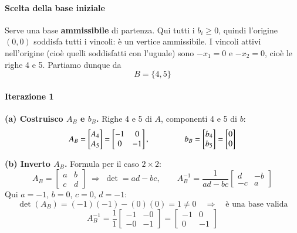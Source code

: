 \documentclass[12pt]{extarticle} %
\begin{document}
\paragraph{Scelta della base iniziale}
Serve una base \textbf{ammissibile} di partenza. Qui tutti i $b_i \ge 0$, quindi l'origine $(0,0)$ soddisfa tutti i vincoli: è un vertice ammissibile. I vincoli attivi nell'origine (cioè quelli soddisfatti con l'uguale) sono $-x_1 = 0$ e $-x_2 = 0$, cioè le righe 4 e 5. Partiamo dunque da
\[
B = \{4,5\}
\]

\bigskip
\paragraph{Iterazione 1}

\textbf{(a) Costruisco $A_B$ e $b_B$.} Righe 4 e 5 di $A$, componenti 4 e 5 di $b$:
\[
A_B = \begin{bmatrix} A_4 \\ A_5 \end{bmatrix} = \begin{bmatrix} -1 & 0\\ 0 & -1\end{bmatrix},
\hspace{1.5cm}
b_B = \begin{bmatrix} b_4 \\ b_5 \end{bmatrix} = \begin{bmatrix} 0\\ 0\end{bmatrix}
\]

\textbf{(b) Inverto $A_B$.} Formula per il caso $2\times2$:
\[
A_B = \begin{bmatrix} a & b\\ c & d\end{bmatrix} \;\Longrightarrow\; \det = ad - bc, \qquad A_B^{-1} = \frac{1}{ad-bc}\begin{bmatrix} d & -b\\ -c & a\end{bmatrix}
\]
Qui $a=-1$, $b=0$, $c=0$, $d=-1$:
\[
\det(A_B) = (-1)(-1) - (0)(0) = 1 \ne 0 \quad\Rightarrow\quad \text{è una base valida}
\]
\[
A_B^{-1} = \frac{1}{1}\begin{bmatrix} -1 & -0\\ -0 & -1\end{bmatrix} = \begin{bmatrix} -1 & 0\\ 0 & -1\end{bmatrix}
\]
\end{document}
